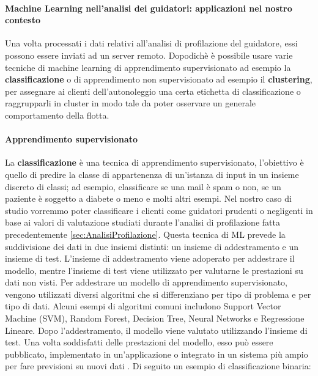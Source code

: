 \documentclass[12pt, a4paper, italian]{report}
\numberwithin{figure}{chapter}
\numberwithin{table}{chapter}
\begin{document}
\vspace{0.5cm}
\paragraph{Machine Learning nell'analisi dei guidatori: applicazioni nel nostro contesto}
Una volta processati i dati relativi all'analisi di profilazione del guidatore, essi possono essere inviati ad un server remoto. Dopodichè è possibile usare varie tecniche di machine learning di apprendimento supervisionato ad esempio la \textbf{classificazione} o di apprendimento non supervisionato ad esempio il \textbf{clustering}, per assegnare ai clienti dell'autonoleggio una certa etichetta di classificazione o raggrupparli in cluster in modo tale da poter osservare un generale comportamento della flotta.

\paragraph{Apprendimento supervisionato}
La \textbf{classificazione} è una tecnica di apprendimento supervisionato, l'obiettivo è quello di predire la classe di appartenenza di un'istanza di input in un insieme discreto di classi; ad esempio, classificare se una mail è spam o non, se un paziente è soggetto a diabete o meno e molti altri esempi. Nel nostro caso di studio vorremmo poter classificare i clienti come guidatori prudenti o negligenti in base ai valori di valutazione studiati durante l'analisi di profilazione fatta precedentemente \ref{sec:AnalisiProfilazione}. Questa tecnica di ML prevede la suddivisione dei dati in due insiemi distinti: un insieme di addestramento e un insieme di test. L'insieme di addestramento viene adoperato per addestrare il modello, mentre l'insieme di test viene utilizzato per valutarne le prestazioni su dati non visti. Per addestrare un modello di apprendimento supervisionato, vengono utilizzati diversi algoritmi che si differenziano per tipo di problema e per tipo di dati. Alcuni esempi di algoritmi comuni includono Support Vector Machine (SVM), Random Forest, Decision Tree, Neural Networks e Regressione Lineare. Dopo l'addestramento, il modello viene valutato utilizzando l'insieme di test. Una volta soddisfatti delle prestazioni del modello, esso può essere pubblicato, implementato in un'applicazione o integrato in un sistema più ampio per fare previsioni su nuovi dati \cite{muhammad2015supervised}. Di seguito un esempio di classificazione binaria: 
\end{document}
